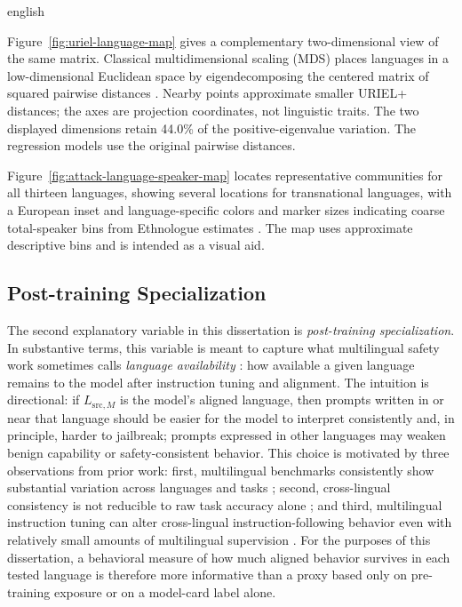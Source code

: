 \begin{otherlanguage*}{english}
\UrielDistanceMatrixTable

Figure~\ref{fig:uriel-language-map} gives a complementary two-dimensional view of the same matrix. Classical multidimensional scaling (MDS) places languages in a low-dimensional Euclidean space by eigendecomposing the centered matrix of squared pairwise distances \cite{gower1966distance}. Nearby points approximate smaller URIEL+ distances; the axes are projection coordinates, not linguistic traits. The two displayed dimensions retain 44.0\% of the positive-eigenvalue variation. The regression models use the original pairwise distances.

\UrielLanguageMapFigure

Figure~\ref{fig:attack-language-speaker-map} locates representative communities for all thirteen languages, showing several locations for transnational languages, with a European inset and language-specific colors and marker sizes indicating coarse total-speaker bins from Ethnologue estimates \cite{eberhard2025ethnologue}. The map uses approximate descriptive bins and is intended as a visual aid.

\AttackLanguageSpeakerMapFigure

\FloatBarrier


\subsection{Post-training Specialization}
\label{sec:post-training-specialization}

The second explanatory variable in this dissertation is \emph{post-training specialization}. In substantive terms, this variable is meant to capture what multilingual safety work sometimes calls \emph{language availability} \cite{dengMultilingualJailbreakChallenges2024}: how available a given language remains to the model after instruction tuning and alignment. The intuition is directional: if $L_{\mathrm{src},M}$ is the model's aligned language, then prompts written in or near that language should be easier for the model to interpret consistently and, in principle, harder to jailbreak; prompts expressed in other languages may weaken benign capability or safety-consistent behavior.
This choice is motivated by three observations from prior work: first, multilingual benchmarks consistently show substantial variation across languages and tasks \cite{hu2020xtreme,chollampatt2025cross}; second, cross-lingual consistency is not reducible to raw task accuracy alone \cite{qi2023crosslingual,xing2024inconsistency}; and third, multilingual instruction tuning can alter cross-lingual instruction-following behavior even with relatively small amounts of multilingual supervision \cite{shaham2024multilingual}. For the purposes of this dissertation, a behavioral measure of how much aligned behavior survives in each tested language is therefore more informative than a proxy based only on pre-training exposure or on a model-card label alone.


\end{otherlanguage*}
